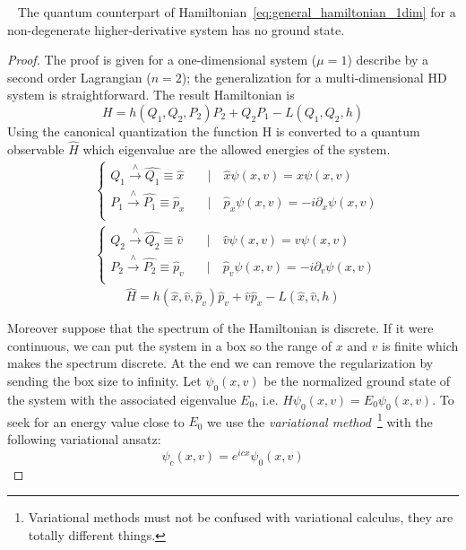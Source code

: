 \begin{theorem}\label{th:ostrogradsky_quantum}~\cite{Smilga17}
  The quantum counterpart of Hamiltonian~\eqref{eq:general_hamiltonian_1dim}
  for a non-degenerate higher-derivative system has no ground state.
\end{theorem}
\begin{proof}
  The proof is given for a one-dimensional system ($\mu=1$) describe by a second
  order Lagrangian ($n=2$); the generalization for a multi-dimensional HD system
  is straightforward. The result Hamiltonian is
  \begin{equation*}
    H = h(Q_1, Q_2, P_2) P_2 + Q_2 P_1 - L(Q_1, Q_2, h)
  \end{equation*}
  Using the canonical quantization the function H is converted to a quantum
  observable $\hat{H}$ which eigenvalue are the allowed energies of the system.
  \begin{align*}
    & \begin{cases}
      Q_1 \xrightarrow{\wedge} \hat{Q_1} \equiv \hat{x}
      \quad &\mid \quad \hat{x}\psi(x, v) = x \psi(x, v) \\
      P_1 \xrightarrow{\wedge} \hat{P_1} \equiv \hat{p}_x
      \quad &\mid \quad \hat{p}_x\psi(x, v) = -i\partial_x \psi(x, v) \\
    \end{cases} \\
    & \begin{cases}
      Q_2 \xrightarrow{\wedge} \hat{Q_2} \equiv \hat{v}
      \quad &\mid \quad \hat{v}\psi(x, v) = v \psi(x, v) \\
      P_2 \xrightarrow{\wedge} \hat{P_2} \equiv \hat{p}_v
      \quad &\mid \quad \hat{p}_v\psi(x, v) = -i\partial_v \psi(x, v) \\
    \end{cases}
  \end{align*}
  \begin{equation} \label{eq:ham_operator_2nd_order}
    \hat{H} = h(\hat{x}, \hat{v}, \hat{p}_v) \hat{p}_v + \hat{v} \hat{p}_x -
    L (\hat{x}, \hat{v}, h)
  \end{equation}

  Moreover suppose that the spectrum of the Hamiltonian is discrete. If it were
  continuous, we can put the system in a box so the range of $x$ and $v$ is
  finite which makes the spectrum discrete. At the end we can remove the
  regularization by sending the box size to infinity. Let $\psi_0(x, v)$ be the
  normalized ground state of the system with the associated eigenvalue $E_0$,
  i.e. $\hat{H}\psi_0(x, v) = E_0 \psi_0(x, v)$. To seek for an energy value
  close to $E_0$ we use the \emph{variational method}~\footnote{
    Variational methods must not be confused with variational calculus, they are
    totally different things.
  } with the following variational ansatz:
  \begin{equation}
    \psi_c(x, v) = e^{icx}\psi_0(x,v)
  \end{equation}


\end{proof}
